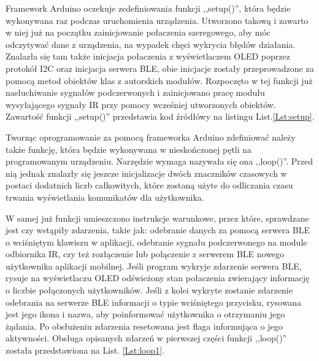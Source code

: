 \documentclass[12pt,twoside]{article}
\begin{document}


Framework Arduino oczekuje zedefiniowania funkcji ,,setup()'', która będzie wykonywana raz podczas uruchomienia urządzenia. Utworzono takową i zawarto w niej już na początku zainicjowanie połaczenia szeregowego, aby móc odczytywać dane z urządzenia, na wypadek chęci wykrycia błędów działania. Znalazła się tam także inicjacja połaczenia z wyświetlaczem OLED poprzez protokół I2C oraz inicjacja serwera BLE, obie inicjacje zostały przeprowadzone za pomocą metod obiektów klas z autorskich modułów. Rozpoczęto w tej funkcji już nasłuchiwanie sygnałów podczerwonych i zainicjowano pracę modułu wysyłającego sygnały IR przy pomocy wcześniej utworzonych obiektów. Zawartość funkcji ,,setup()'' przedstawia kod źródłówy na listingu List.\ref*{Lst:setup}.



Tworząc oprogramowanie za pomocą frameworka Arduino zdefiniować należy także funkcję, która będzie wykonywana w nieskończonej pętli na programowanym urządzeniu. Narzędzie wymaga nazywała się ona ,,loop()''. Przed nią jednak znalazły się jeszcze inicjalizacje dwóch znaczników czasowych w postaci dodatnich liczb całkowitych, które zostaną użyte do odliczania czasu trwania wyświetlania komunikatów dla użytkownika.

W samej już funkcji umieszczono instrukcje warunkowe, przez które, sprawdzane jest czy wstąpiły zdarzenia, takie jak: odebranie danych za pomocą serwera BLE o wciśniętym klawiszu w aplikacji, odebranie sygnału podczerwonego na module odbiornika IR, czy też rozłączenie lub połączenie z serwerem BLE nowego użytkownika aplikacji mobilnej. Jeśli program wykryje zdarzenie serwera BLE, rysuje na wyświetlaczu OLED odświeżony stan połaczenia zwierający informację o liczbie połączonych użytkowników. Jeśli z kolei wykryte zostanie zdarzenie odebrania na serwerze BLE informacji o typie wciśniętego przycisku, rysowana jest jego ikona i nazwa, aby poinformować użytkownika o otrzymaniu jego żądania. Po obsłużeniu zdarzenia resetowana jest flaga informująca o jego aktywności. Obsługa opisanych zdarzeń w pierwszej części funkcji ,,loop()'' została przedstawiona na List. \ref*{Lst:loop1}.

\end{document}
